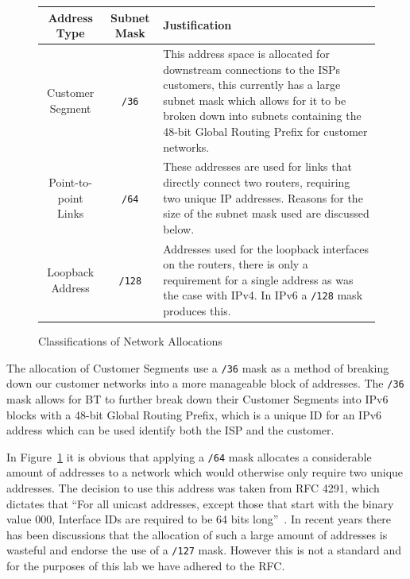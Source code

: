 \begin{figure}[!ht]
    \caption{Classifications of Network Allocations}
    \label{figure:network-alloc-3}
    \centering
    \begin{tabular}{|c|c|p{5.5cm}|}

        \hline \textbf{Address Type} & \textbf{Subnet Mask} &
        \textbf{Justification} \\

        \hline
        Customer Segment & \texttt{/36} & This address space is allocated for
downstream connections to the ISPs customers, this currently has a large subnet
mask which allows for it to be broken down into subnets containing the 48-bit
Global Routing Prefix for customer networks.\\

        \hline
        Point-to-point Links & \texttt{/64} & These addresses
are used for links that directly connect two routers, requiring two unique IP
addresses. Reasons for the size of the subnet mask used are discussed below.\\

        \hline
        Loopback Address & \texttt{/128} & Addresses used for the loopback
interfaces on the routers, there is only a requirement for a single address as
was the case with IPv4. In IPv6 a \texttt{/128} mask produces this.\\

		\hline
    \end{tabular}
\end{figure}

The allocation of Customer Segments use a \texttt{/36} mask as a method of
breaking down our customer networks into a more manageable block of addresses.
The \texttt{/36} mask allows for BT to further break down their Customer
Segments into IPv6 blocks with a 48-bit Global Routing Prefix, which is a
unique ID for an IPv6 address which can be used identify both the ISP and the
customer.

In Figure~\ref{figure:network-alloc-3} it is obvious that applying a
\texttt{/64} mask allocates a considerable amount of addresses to a network
which would otherwise only require two unique addresses. The decision to use
this address was taken from RFC 4291, which dictates that ``For all unicast
addresses, except those that start with the binary value 000, Interface IDs are
required to be 64 bits long''~\cite{rfc4291}. In recent years there has been
discussions that the allocation of such a large amount of addresses is wasteful
and endorse the use of a \texttt{/127} mask. However this is not a standard and
for the purposes of this lab we have adhered to the RFC.
